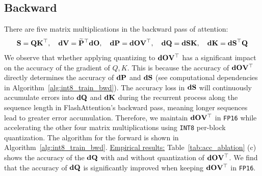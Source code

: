 \subsection{Backward}

There are five matrix multiplications in the backward pass of attention:
\begin{align}
    \mathbf{S} = \mathbf{Q}\mathbf{K}^\top,~~~
    \mathbf{dV} = \widetilde {\mathbf{P}}^\top \mathbf{dO},~~~
    \mathbf{dP} = \mathbf{dO} \mathbf{V}^\top,~~~
    \mathbf{dQ} = \mathbf{dS} \mathbf{K},~~~
    \mathbf{dK} = \mathbf{dS}^\top \mathbf{Q}
\end{align}
We observe that whether applying quantizing to $\mathbf{dO} \mathbf{V}^\top$ has a significant impact on the accuracy of the gradient of $Q, K$. This is because the accuracy of $\mathbf{dO} \mathbf{V}^\top$ directly determines the accuracy of $\mathbf{dP}$ and $\mathbf{dS}$ (see computational dependencies in Algorithm~\ref{alg:int8_train_bwd}). The accuracy loss in $\mathbf{dS}$ will continuously accumulate errors into $\mathbf{dQ}$ and $\mathbf{dK}$ during the recurrent process along the sequence length in FlashAttention's backward pass, meaning longer sequences lead to greater error accumulation. 
Therefore, we maintain $\mathbf{dO} \mathbf{V}^\top$ in \texttt{FP16} while accelerating the other four matrix multiplications using \texttt{INT8} per-block quantization.  The algorithm for the forward is shown in Algorithm~\ref{alg:int8_train_bwd}. 
\underline{Empirical results:} Table~\ref{tab:acc_ablation} (c) shows the accuracy of the $\mathbf{dQ}$ with and without quantization of $\mathbf{dO} \mathbf{V}^\top$. We find that the accuracy of $\mathbf{dQ}$ is significantly improved when keeping $\mathbf{dO} \mathbf{V}^\top$ in \texttt{FP16}.




